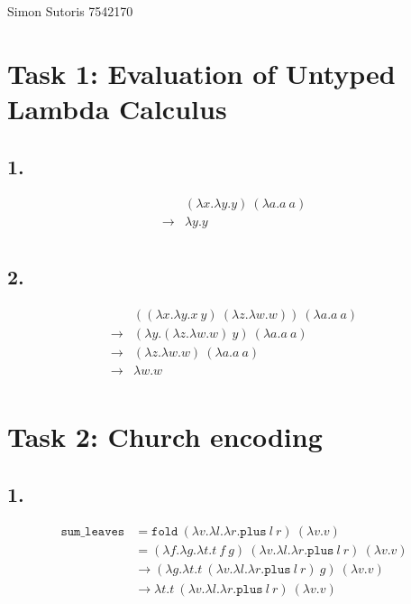 \documentclass[13pt, a4paper]{article}
\begin{document}
Simon Sutoris 7542170

\section*{Task 1: Evaluation of Untyped Lambda Calculus}

\subsection*{1.}
\[
\begin{array}{llr}
& (\lambda x.\lambda y.y)\ (\lambda a.a\ a) \\
\to & \lambda y.y \\
\end{array}
\]

\subsection*{2.}
\[
\begin{array}{llr}
& ((\lambda x.\lambda y.x\ y)\ (\lambda z.\lambda w.w))\ (\lambda a.a\ a) \\
\to & (\lambda y.(\lambda z.\lambda w.w)\ y)\ (\lambda a.a\ a) \\
\to & (\lambda z.\lambda w.w)\ (\lambda a.a\ a)\\
\to & \lambda w.w \\
\end{array}
\]

\section*{Task 2: Church encoding}

\subsection*{1.} %

\[
\begin{aligned}
\texttt{sum\_leaves} &= \texttt{fold}\ (\lambda v.\lambda l. \lambda r.\texttt{plus}\ l\ r)\ (\lambda v.v) \\
&= (\lambda f.\lambda g.\lambda t.t\ f\ g)\ (\lambda v.\lambda l. \lambda r.\texttt{plus}\ l\ r)\ (\lambda v.v) \\
&\to (\lambda g.\lambda t.t\ (\lambda v.\lambda l. \lambda r.\texttt{plus}\ l\ r)\ g)\ (\lambda v.v) \\
&\to \lambda t.t\ (\lambda v.\lambda l. \lambda r.\texttt{plus}\ l\ r)\ (\lambda v.v) \\
\end{aligned}
\]
\end{document}
